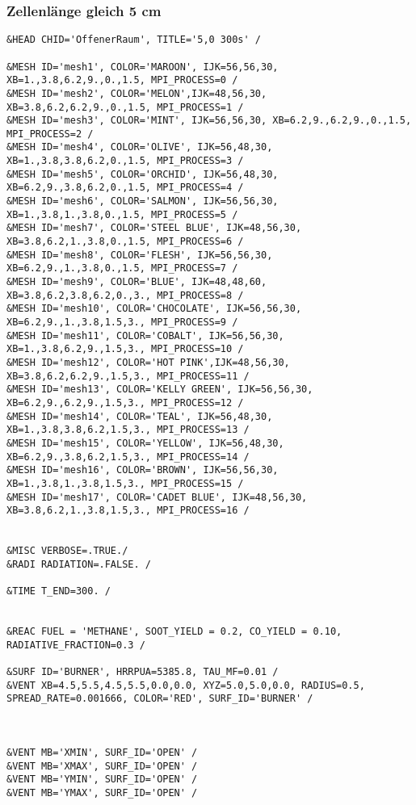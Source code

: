 \subsubsection{Zellenlänge gleich 5 cm}
\begin{lstlisting}[emptylines=0,basicstyle=\tiny]
&HEAD CHID='OffenerRaum', TITLE='5,0 300s' /

&MESH ID='mesh1', COLOR='MAROON', IJK=56,56,30, XB=1.,3.8,6.2,9.,0.,1.5, MPI_PROCESS=0 /
&MESH ID='mesh2', COLOR='MELON',IJK=48,56,30, XB=3.8,6.2,6.2,9.,0.,1.5, MPI_PROCESS=1 /
&MESH ID='mesh3', COLOR='MINT', IJK=56,56,30, XB=6.2,9.,6.2,9.,0.,1.5, MPI_PROCESS=2 /
&MESH ID='mesh4', COLOR='OLIVE', IJK=56,48,30, XB=1.,3.8,3.8,6.2,0.,1.5, MPI_PROCESS=3 /
&MESH ID='mesh5', COLOR='ORCHID', IJK=56,48,30, XB=6.2,9.,3.8,6.2,0.,1.5, MPI_PROCESS=4 /
&MESH ID='mesh6', COLOR='SALMON', IJK=56,56,30, XB=1.,3.8,1.,3.8,0.,1.5, MPI_PROCESS=5 /
&MESH ID='mesh7', COLOR='STEEL BLUE', IJK=48,56,30, XB=3.8,6.2,1.,3.8,0.,1.5, MPI_PROCESS=6 /
&MESH ID='mesh8', COLOR='FLESH', IJK=56,56,30, XB=6.2,9.,1.,3.8,0.,1.5, MPI_PROCESS=7 /
&MESH ID='mesh9', COLOR='BLUE', IJK=48,48,60, XB=3.8,6.2,3.8,6.2,0.,3., MPI_PROCESS=8 /
&MESH ID='mesh10', COLOR='CHOCOLATE', IJK=56,56,30, XB=6.2,9.,1.,3.8,1.5,3., MPI_PROCESS=9 /
&MESH ID='mesh11', COLOR='COBALT', IJK=56,56,30, XB=1.,3.8,6.2,9.,1.5,3., MPI_PROCESS=10 /
&MESH ID='mesh12', COLOR='HOT PINK',IJK=48,56,30, XB=3.8,6.2,6.2,9.,1.5,3., MPI_PROCESS=11 /
&MESH ID='mesh13', COLOR='KELLY GREEN', IJK=56,56,30, XB=6.2,9.,6.2,9.,1.5,3., MPI_PROCESS=12 /
&MESH ID='mesh14', COLOR='TEAL', IJK=56,48,30, XB=1.,3.8,3.8,6.2,1.5,3., MPI_PROCESS=13 /
&MESH ID='mesh15', COLOR='YELLOW', IJK=56,48,30, XB=6.2,9.,3.8,6.2,1.5,3., MPI_PROCESS=14 /
&MESH ID='mesh16', COLOR='BROWN', IJK=56,56,30, XB=1.,3.8,1.,3.8,1.5,3., MPI_PROCESS=15 /
&MESH ID='mesh17', COLOR='CADET BLUE', IJK=48,56,30, XB=3.8,6.2,1.,3.8,1.5,3., MPI_PROCESS=16 /


&MISC VERBOSE=.TRUE./
&RADI RADIATION=.FALSE. /

&TIME T_END=300. /


&REAC FUEL = 'METHANE', SOOT_YIELD = 0.2, CO_YIELD = 0.10, RADIATIVE_FRACTION=0.3 /

&SURF ID='BURNER', HRRPUA=5385.8, TAU_MF=0.01 /
&VENT XB=4.5,5.5,4.5,5.5,0.0,0.0, XYZ=5.0,5.0,0.0, RADIUS=0.5, SPREAD_RATE=0.001666, COLOR='RED', SURF_ID='BURNER' /



&VENT MB='XMIN', SURF_ID='OPEN' /  
&VENT MB='XMAX', SURF_ID='OPEN' /  
&VENT MB='YMIN', SURF_ID='OPEN' /  
&VENT MB='YMAX', SURF_ID='OPEN' / 


\end{lstlisting}
